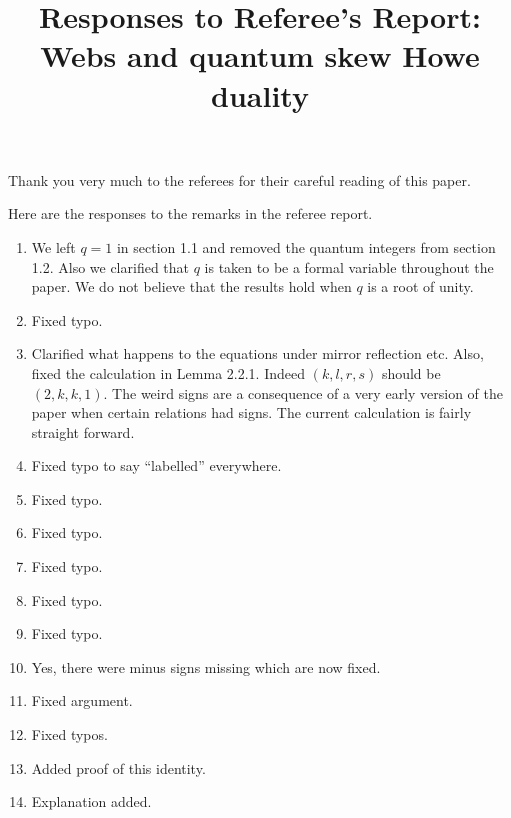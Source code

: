 \documentclass{amsart}
\title{Responses to Referee's Report: Webs and quantum skew Howe duality}
\begin{document}
\maketitle



Thank you very much to the referees for their careful reading of this paper.



Here are the responses to the remarks in the referee report.



\begin{enumerate}

\item We left $ q = 1 $ in section 1.1 and removed the quantum integers from section 1.2.   Also we clarified that $ q $ is taken to be a formal variable throughout the paper.  We do not believe that the results hold when $ q $ is a root of unity. 
    
\item Fixed typo.

\item Clarified what happens to the equations under mirror reflection etc. Also, fixed the calculation in Lemma 2.2.1. Indeed $(k,l,r,s)$ should be $(2,k,k,1)$. The weird signs are a consequence of a very early version of the paper when certain relations had signs. The current calculation is fairly straight forward.

\item Fixed typo to say ``labelled'' everywhere.

\item Fixed typo.

\item Fixed typo.

\item Fixed typo.

\item Fixed typo.

\item Fixed typo.

\item Yes, there were minus signs missing which are now fixed.

\item Fixed argument.

\item Fixed typos.

\item Added proof of this identity.

\item Explanation added.


\end{enumerate}
\end{document}
